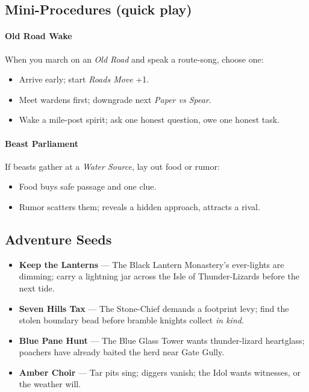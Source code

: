 \subsection*{Mini-Procedures (quick play)}
\paragraph{Old Road Wake}
When you march on an \emph{Old Road} and speak a route-song, choose one:
\begin{itemize}
  \item Arrive early; start \emph{Roads Move} +1.
  \item Meet wardens first; downgrade next \emph{Paper vs Spear}.
  \item Wake a mile-post spirit; ask one honest question, owe one honest task.
\end{itemize}

\paragraph{Beast Parliament}
If beasts gather at a \emph{Water Source}, lay out food or rumor:
\begin{itemize}
  \item Food buys safe passage and one clue.
  \item Rumor scatters them; reveals a hidden approach, attracts a rival.
\end{itemize}

\subsection*{Adventure Seeds}
\begin{itemize}
  \item \textbf{Keep the Lanterns} — The Black Lantern Monastery’s ever-lights are dimming; carry a lightning jar across the Isle of Thunder-Lizards before the next tide.
  \item \textbf{Seven Hills Tax} — The Stone-Chief demands a footprint levy; find the stolen boundary bead before bramble knights collect \emph{in kind}.
  \item \textbf{Blue Pane Hunt} — The Blue Glass Tower wants thunder-lizard heartglass; poachers have already baited the herd near Gate Gully.
  \item \textbf{Amber Choir} — Tar pits sing; diggers vanish; the Idol wants witnesses, or the weather will.
\end{itemize}